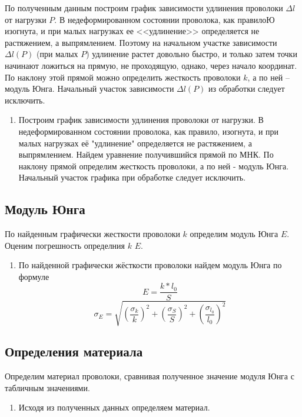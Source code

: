 \documentclass[a4paper, 12pt]{article}%
\begin{document}
По полученным данным построим график зависимости удлинения проволоки $\Delta l $ от нагрузки $P$. В недеформированном состоянии проволока, как правилоЮ изогнута, и при малых нагрузках ее <<удлинение>> определяется не растяжением, а выпрямлением. Поэтому на начальном участке зависимости $\Delta l (P)$ (при малых $P$) удлинение растет довольно быстро, и только затем точки начинают ложиться на прямую, не проходящую, однако, через начало координат. По наклону этой прямой можно определить жесткость проволоки $k$, а по ней -- модуль Юнга. Начальный участок зависимости $\Delta l (P)$ из обработки следует исключить.

\begin{enumerate}
\item Построим график зависимости удлинения проволоки от нагрузки. В недеформированном состоянии проволока, как правило, изогнута, и при малых нагрузках её "удлинение" определяется не растяжением, а выпрямлением. Найдем уравнение получившийся прямой по МНК. По наклону прямой определим жесткость проволоки, а по ней - модуль Юнга. Начальный участок графика при обработке следует исключить. 
\end{enumerate}


\subsection{Модуль Юнга}

По найденным графически жесткости проволоки $k$ определим модуль Юнга $E$. Оценим погрешность определния $k$ $E$.

\begin{enumerate}
\item По найденной графически жёсткости проволоки найдем модуль Юнга по формуле
\[E = \dfrac{k*l_0}{S}\]
\[\sigma_E = \sqrt{\left( \dfrac{\sigma_{k}}{k} \right)^2 + \left( \dfrac{\sigma_{S}}{S} \right)^2 + \left( \dfrac{\sigma_{l_0}}{l_0} \right)^2 }\]
\end{enumerate}

\subsection{Определения материала}

Определим материал проволоки, сравнивая полученное значение модуля Юнга с табличным значениями.

\begin{enumerate}
\item Исходя из полученных данных определяем материал.
\end{enumerate}
\end{document}
